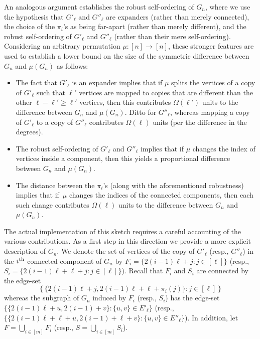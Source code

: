 \documentclass[10pt,a4paper]{article}
\theoremstyle{definition}
\newcommand{\xth}{{\rm th}}
\newcommand{\BI}{\begin{itemize}}
\newcommand{\EI}{\end{itemize}}
\begin{document}
An analogous argument establishes the robust self-ordering of $G_n$,
where we use the hypothesis that $G'_\ell$ and $G''_\ell$ are expanders
(rather than merely connected),
the choice of the $\pi_i$'s as being far-apart
(rather than merely different),
and the robust self-ordering of $G'_\ell$ and $G''_\ell$
(rather than their mere self-ordering).
%
Considering an arbitrary permutation $\mu:[n]\to[n]$,
these stronger features are used to establish a lower bound on the size
of the symmetric difference between $G_n$ and $\mu(G_n)$ as follows:
\BI
\item
The fact that $G'_\ell$ is an expander implies that if $\mu$ splits
the vertices of a copy of $G'_\ell$ such that $\ell'$ vertices are mapped
to copies that are different than the other $\ell-\ell'\geq\ell'$ vertices,
then this contributes $\Omega(\ell')$ units
to the difference between $G_n$ and $\mu(G_n)$.
Ditto for $G''_\ell$, whereas mapping a copy of $G'_\ell$
to a copy of $G''_\ell$ contributes $\Omega(\ell)$ units
(per the difference in the degrees).
\item
The robust self-ordering of $G'_\ell$ and $G''_\ell$ implies that
if $\mu$ changes the index of vertices inside a component,
then this yields a proportional difference between $G_n$ and $\mu(G_n)$.
\item
The distance between the $\pi_i$'s
(along with the aforementioned robustness)
implies that if~$\mu$ changes the indices of the connected components,
then each such change contributes $\Omega(\ell)$ units
to the difference between $G_n$ and $\mu(G_n)$.
\EI
The actual implementation of this sketch requires
a careful accounting of the various contributions.
As a first step in this direction we provide
a more explicit description of $G_n$.
We denote the set of vertices
of the copy of $G'_\ell$ (resp., $G''_\ell$)
in the $i^\xth$ connected component of $G_n$
by $F_i=\{2(i-1)\ell+j:j\in[\ell]\}$
(resp., $S_i=\{2(i-1)\ell+\ell+j:j\in[\ell]\}$).
Recall that $F_i$ and $S_i$ are connected by the edge-set
\begin{equation}\label{edges-of-cc:eq2}
\left\{\{2(i-1)\ell+j,2(i-1)\ell+\ell+\pi_i(j)\}:j\!\in\![\ell]\right\}
\end{equation}
whereas the subgraph of $G_n$ induced by $F_i$ (resp., $S_i$)
has the edge-set $\{\{2(i-1)\ell+u,2(i-1)+v\}:\{u,v\}\!\in\!E'_\ell\}$
(resp., $\{\{2(i-1)\ell+\ell+u,2(i-1)+\ell+v\}:\{u,v\}\!\in\!E''_\ell\}$).
In addition, let $F=\bigcup_{i\in[m]}F_i$
(resp., $S=\bigcup_{i\in[m]}S_i$).
\end{document}

